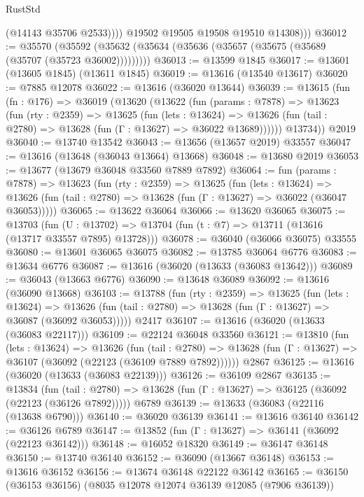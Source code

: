 \begin{lexlean}{RustStd}
\begin{coremodule}
                (@14143 @35706 @2533))))
          @19502
          @19505
          @19508
          @19510
          @14308)))
@36012 := @35570
    (@35592 (@35632 (@35634 (@35636 (@35657 (@35675 (@35689 (@35707 (@35723 @36002)))))))))
@36013 := @13599 @1845
@36017 := @13601 (@13605 @1845) (@13611 @1845)
@36019 := @13616 (@13540 @13617)
@36020 := @7885 @12078
@36022 := @13616 (@36020 @13644)
@36039 := @13615
    (fun (fn : @176) =>
    @36019
      (@13620
        (@13622
          (fun (params : @7878) =>
          @13623
            (fun (rty : @2359) =>
            @13625
              (fun (lets : @13624) =>
              @13626 (fun (tail : @2780) => @13628 (fun (Γ : @13627) => @36022 @13689))))))
        @13734))
    @2019
@36040 := @13740 @13542
@36043 := @13656 (@13657 @2019) @33557
@36047 := @13616 (@13648 (@36043 @13664) @13668)
@36048 := @13680 @2019
@36053 := @13677 (@13679 @36048 @33560 @7889 @7892)
@36064 := fun (params : @7878) =>
  @13623
    (fun (rty : @2359) =>
    @13625
      (fun (lets : @13624) =>
      @13626 (fun (tail : @2780) => @13628 (fun (Γ : @13627) => @36022 (@36047 @36053)))))
@36065 := @13622 @36064
@36066 := @13620 @36065
@36075 := @13703
    (fun (U : @13702) => @13704 (fun (t : @7) => @13711 (@13616 (@13717 @33557 @7895) @13728)))
@36078 := @36040 (@36066 @36075) @33555
@36080 := @13601 @36065 @36075
@36082 := @13785 @36064 @6776
@36083 := @13634 @6776
@36087 := @13616 (@36020 (@13633 (@36083 @13642)))
@36089 := @36043 (@13663 @6776)
@36090 := @13648 @36089
@36092 := @13616 (@36090 @13668)
@36103 := @13788
    (fun (rty : @2359) =>
    @13625
      (fun (lets : @13624) =>
      @13626 (fun (tail : @2780) => @13628 (fun (Γ : @13627) => @36087 (@36092 @36053)))))
    @2417
@36107 := @13616 (@36020 (@13633 (@36083 @22117)))
@36109 := @22124 @36048 @33560
@36121 := @13810
    (fun (lets : @13624) =>
    @13626
      (fun (tail : @2780) =>
      @13628 (fun (Γ : @13627) => @36107 (@36092 (@22123 (@36109 @7889 @7892))))))
    @2867
@36125 := @13616 (@36020 (@13633 (@36083 @22139)))
@36126 := @36109 @2867
@36135 := @13834
    (fun (tail : @2780) => @13628 (fun (Γ : @13627) => @36125 (@36092 (@22123 (@36126 @7892)))))
    @6789
@36139 := @13633 (@36083 (@22116 (@13638 @6790)))
@36140 := @36020 @36139
@36141 := @13616 @36140
@36142 := @36126 @6789
@36147 := @13852 (fun (Γ : @13627) => @36141 (@36092 (@22123 @36142)))
@36148 := @16052 @18320
@36149 := @36147 @36148
@36150 := @13740 @36140
@36152 := @36090 (@13667 @36148)
@36153 := @13616 @36152
@36156 := @13674 @36148 @22122 @36142
@36165 := @36150 (@36153 @36156) (@8035 @12078 @12074 @36139 @12085 (@7906 @36139))

\end{coremodule}
\end{lexlean}
